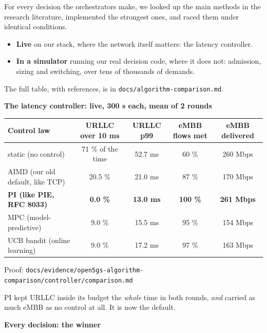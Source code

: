 \documentclass[11pt]{article}
\newcommand{\proof}[1]{\par{\footnotesize\color{grey}Proof: \texttt{#1}}\par}
\begin{document}
For every decision the orchestrators make, we looked up the main methods in the research
literature, implemented the strongest ones, and raced them under identical conditions.
\begin{itemize}
  \item \textbf{Live} on our stack, where the network itself matters: the latency controller.
  \item \textbf{In a simulator} running our real decision code, where it does not: admission,
        sizing and switching, over tens of thousands of demands.
\end{itemize}
The full table, with references, is in \texttt{docs/algorithm-comparison.md}.

\textbf{The latency controller: live, 300 s each, mean of 2 rounds}

{\small\begin{tabularx}{\linewidth}{@{}>{\raggedright\arraybackslash}Xcccc@{}}
\toprule
\textbf{Control law} & \textbf{URLLC over 10 ms} & \textbf{URLLC p99} & \textbf{eMBB flows met} & \textbf{eMBB delivered} \\ \midrule
static (no control) & 71 \% of the time & 52.7 ms & 60 \% & 260 Mbps \\
AIMD (our old default, like TCP) & 20.5 \% & 21.0 ms & 87 \% & 170 Mbps \\
\textbf{PI (like PIE, RFC 8033)} & \textbf{\color{ok}0.0 \%} & \textbf{\color{ok}13.0 ms} & \textbf{\color{ok}100 \%} & \textbf{\color{ok}261 Mbps} \\
MPC (model-predictive) & 9.0 \% & 15.5 ms & 95 \% & 154 Mbps \\
UCB bandit (online learning) & 9.0 \% & 17.2 ms & 97 \% & 163 Mbps \\
\bottomrule
\end{tabularx}}
\proof{docs/evidence/open5gs-algorithm-comparison/controller/comparison.md}

PI kept URLLC inside its budget the \emph{whole} time in both rounds, \emph{and} carried as much
eMBB as no control at all. It is now the default.

\textbf{Every decision: the winner}
\end{document}

